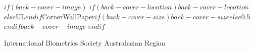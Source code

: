 
\cleardoublepage
\newpage

\pagestyle{empty}

$if(back-cover-image)$
\This$if(back-cover-location)$$back-cover-location$$else$UL$endif$CornerWallPaper{$if(back-cover-size)$$back-cover-size$$else$0.5$endif$}{$back-cover-image$}
$endif$


\centering



International Biometrics Society Australasian Region

